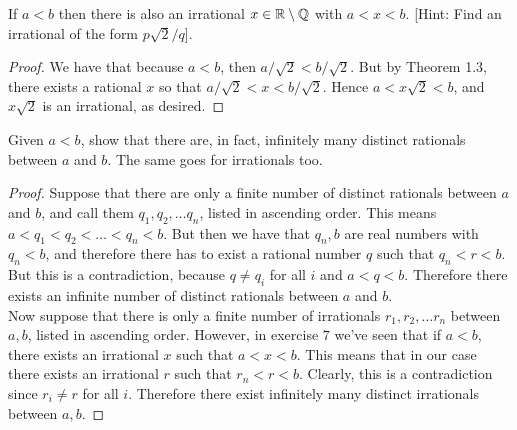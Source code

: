 \begin{exercise}{7}
If $a<b$ then there is also an irrational $x\in\mathbb{R}\setminus\mathbb{Q}$ with $a<x<b$. [Hint: Find an irrational of the form $p\sqrt{2}/q$].
\end{exercise}
\begin{proof}
 We have that because $a<b$, then $a/\sqrt{2}<b/\sqrt{2}$. But by Theorem 1.3, there exists a rational $x$ so that $a/\sqrt{2}<x<b/\sqrt{2}$. Hence $a<x\sqrt{2}<b$, and $x\sqrt{2}$ is an irrational, as desired.
\end{proof}

\begin{exercise}{8}
    Given $a < b$, show that there are, in fact, infinitely many distinct rationals between $a$ and $b$. The same goes for irrationals too.
\end{exercise}

\begin{proof}

    Suppose that there are only a finite number of distinct rationals between $a$ and $b$, and call them $q_1, q_2, \ldots q_n$, listed in ascending order. This means $a < q_1 < q_2 < \ldots < q_n < b$. But then we have that $q_n, b$ are real numbers with $q_n < b$, and therefore there has to exist a rational number $q$ such that $q_n < r < b$. But this is a contradiction, because $q \neq q_i$ for all $i$ and $a < q < b$. Therefore there exists an infinite number of distinct rationals between $a$ and $b$.\\

    Now suppose that there is only a finite number of irrationals $r_1, r_2, \ldots r_n$ between $a, b$, listed in ascending order. However, in exercise $7$ we've seen that if $a < b$, there exists an irrational $x$ such that $a < x < b$. This means that in our case there exists an irrational $r$ such that $r_n < r <b$. Clearly, this is a contradiction since $r_i \neq r$ for all $i$. Therefore there exist infinitely many distinct irrationals between $a, b$.
\end{proof}


